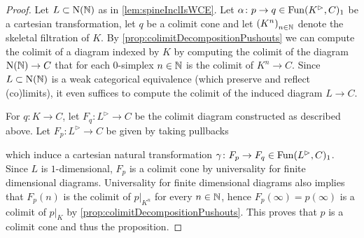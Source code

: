 \begin{lemma}
\begin{proof}
        Let $L\subset\operatorname{N}(\mathbb{N})$ as in \cref{lem:spineInclIsWCE}.
        Let $\alpha\colon p\to q\in\operatorname{Fun}(K^{\rhd},C)_1$ be a cartesian transformation, let $q$ be a colimit cone and let $\left(K^n\right)_{n\in\mathbb{N}}$ denote the skeletal filtration of $K$.
        By \cref{prop:colimitDecompositionPushouts} we can compute the colimit of a diagram indexed by $K$ by computing the colimit of the diagram $\operatorname{N}(\mathbb{N})\to C$ that for each $0$-simplex $n\in\mathbb{N}$ is the colimit of $K^n\to C$.
        Since $L\subset\operatorname{N}(\mathbb{N})$ is a weak categorical equivalence (which preserve and reflect (co)limits), it even suffices to compute the colimit of the induced diagram $L\to C$.


        For $q\colon K\to C$, let $F_q\colon L^{\rhd}\to C$ be the colimit diagram constructed as described above.
        Let $F_p\colon L^{\rhd}\to C$ be given by taking pullbacks
        \begin{center}
        \end{center}
        which induce a cartesian natural transformation $\gamma\colon F_p\to F_q\in\operatorname{Fun}(L^{\rhd},C)_1$.
        Since $L$ is $1$-dimensional, $F_p$ is a colimit cone by universality for finite dimensional diagrams.
        Universality for finite dimensional diagrams also implies that $F_p(n)$ is the colimit of $p|_{K^n}$ for every $n\in\mathbb{N}$, hence $F_p(\infty)=p(\infty)$ is a colimit of $p|_K$ by \cref{prop:colimitDecompositionPushouts}.
        This proves that $p$ is a colimit cone and thus the proposition. 
    \end{proof}
\end{lemma}
